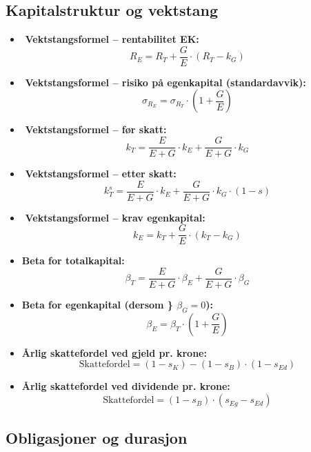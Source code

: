 \documentclass[
  11pt,
  a4paper,
]{article}
\begin{document}
\subsection{Kapitalstruktur og
vektstang}\label{kapitalstruktur-og-vektstang}

\begin{itemize}
\item
  ️ \textbf{Vektstangsformel -- rentabilitet EK:}\\
  \[
  R_E = R_T + \frac{G}{E} \cdot (R_T - k_G)
  \]
\item
  ️ \textbf{Vektstangsformel -- risiko på egenkapital (standardavvik):}\\
  \[
  \sigma_{R_E} = \sigma_{R_T} \cdot \left( 1 + \frac{G}{E} \right)
  \]
\item
  ️ \textbf{Vektstangsformel -- før skatt:}\\
  \[
  k_T = \frac{E}{E + G} \cdot k_E + \frac{G}{E + G} \cdot k_G 
  \]
\item
  ️ \textbf{Vektstangsformel -- etter skatt:}\\
  \[
  k_T^s = \frac{E}{E + G} \cdot k_E + \frac{G}{E + G} \cdot k_G \cdot (1 - s)
  \]
\item
  ️ \textbf{Vektstangsformel -- krav egenkapital:}\\
  \[
  k_E = k_T + \frac{G}{E} \cdot (k_T - k_G) 
  \]
\item
  \textbf{Beta for totalkapital:}\\
  \[
  \beta_T = \frac{E}{E + G} \cdot \beta_E + \frac{G}{E + G} \cdot \beta_G
  \]
\item
  \textbf{Beta for egenkapital (dersom \} \(\beta_G = 0\)):}\\
  \[
  \beta_E = \beta_T \cdot \left( 1 + \frac{G}{E} \right)
  \]
\item
  \textbf{Årlig skattefordel ved gjeld pr. krone:}\\
  \[
  \text{Skattefordel} =  (1 - s_K) - (1 - s_{B}) \cdot (1 - s_{Ed})
  \]
\item
  \textbf{Årlig skattefordel ved dividende pr. krone:}\\
  \[
  \text{Skattefordel} = (1 - s_{B}) \cdot (s_{Eg} - s_{Ed})
  \]
\end{itemize}

\subsection{Obligasjoner og durasjon}\label{obligasjoner-og-durasjon}
\end{document}
